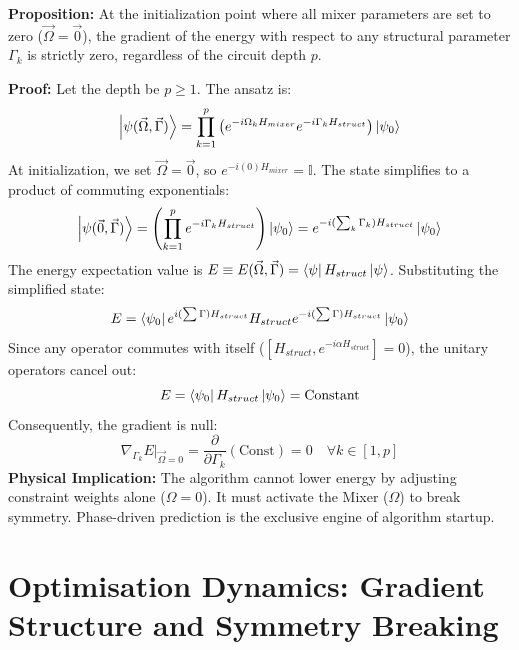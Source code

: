 \documentclass[12pt, a4paper, oneside]{report}
\begin{document}
\textbf{Proposition:} At the initialization point where all mixer parameters are set to zero ($\vec{\Omega} = \vec{0}$), the gradient of the energy with respect to any structural parameter $\Gamma_k$ is strictly zero, regardless of the circuit depth $p$.

\textbf{Proof:}
Let the depth be $p \geq 1$. The ansatz is:
\begin{equation}
    \ket{\psi(\vec{\Omega}, \vec{\Gamma})} = \prod_{k=1}^p \left( e^{-i\Omega_k H_{mixer}} e^{-i\Gamma_k H_{struct}} \right) \ket{\psi_0}
\end{equation}
At initialization, we set $\vec{\Omega} = \vec{0}$, so $e^{-i(0) H_{mixer}} = \mathbb{I}$. The state simplifies to a product of commuting exponentials:
\begin{equation}
    \ket{\psi(\vec{0}, \vec{\Gamma})} = \left( \prod_{k=1}^p e^{-i\Gamma_k H_{struct}} \right) \ket{\psi_0} = e^{-i (\sum_k \Gamma_k) H_{struct}} \ket{\psi_0}
\end{equation}
The energy expectation value is $E\equiv E(\vec{\Omega},\vec{\Gamma}) = \bra{\psi} H_{struct} \ket{\psi}$. Substituting the simplified state:
\begin{equation}
    E = \bra{\psi_0} e^{i (\sum \Gamma) H_{struct}} H_{struct} e^{-i (\sum \Gamma) H_{struct}} \ket{\psi_0}
\end{equation}
Since any operator commutes with itself ($[H_{struct}, e^{-i \alpha H_{struct}}] = 0$), the unitary operators cancel out:
\begin{equation}
    E = \bra{\psi_0} H_{struct} \ket{\psi_0} = \text{Constant}
\end{equation}
Consequently, the gradient is null:
\begin{equation}
    \nabla_{\Gamma_k} E \Big|_{\vec{\Omega}=0} = \frac{\partial}{\partial \Gamma_k} (\text{Const}) = 0 \quad \forall k \in [1, p]
\end{equation}
\textbf{Physical Implication:} The algorithm cannot lower energy by adjusting constraint weights alone ($\Omega = 0$). It must activate the Mixer ($\Omega$) to break symmetry. Phase-driven prediction is the exclusive engine of algorithm startup.

\section{Optimisation Dynamics: Gradient Structure and Symmetry Breaking}
\label{sec:minimization-dynamics}
\end{document}
